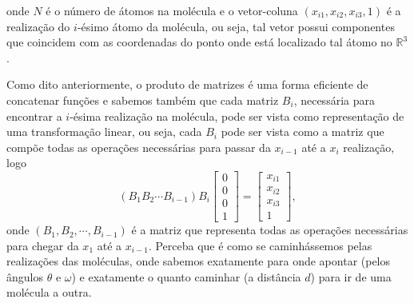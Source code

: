 \documentclass[a4paper,12pt]{article}
\begin{document}
	 onde $N$ é o número de átomos na molécula e o vetor-coluna $(x_{i1}, x_{i2}, x_{i3}, 1)$ é a realização do $i$-ésimo átomo da molécula, ou seja, tal vetor possui componentes que coincidem com as coordenadas do ponto onde está localizado tal átomo no $\mathbb{R}^3$.
	 
	 Como dito anteriormente, o produto de matrizes é uma forma eficiente de concatenar funções e sabemos também que cada matriz $B_i$, necessária para encontrar a $i$-ésima realização na molécula, pode ser vista como representação de uma transformação linear, ou seja, cada $B_i$ pode ser vista como a matriz que compõe todas as operações necessárias para passar da $x_{i-1}$ até a $x_i$ realização, logo
	 $$
	 (B_1 B_2 \cdots B_{i-1})
	 B_i
	 \begin{bmatrix}
	 0\\ 
	 0\\ 
	 0\\ 
	 1
	 \end{bmatrix}
	 = \begin{bmatrix}
	 x_{i1}\\ 
	 x_{i2}\\ 
	 x_{i3}\\ 
	 1
	 \end{bmatrix},
	 $$
	 onde $(B_1,B_2,\cdots,B_{i-1})$ é a matriz que representa todas as operações necessárias para chegar da $x_1$ até a $x_{i-1}$. Perceba que é como se caminhássemos pelas realizações das moléculas, onde sabemos exatamente para onde apontar (pelos ângulos $\theta$ e $\omega$) e exatamente o quanto caminhar (a distância $d$) para ir de uma molécula a outra.
	 
\end{document}
